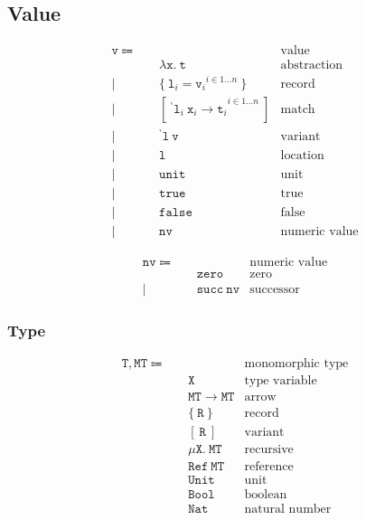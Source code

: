 \documentclass{article}
\newcommand{\code}{\mathtt}
\newcommand{\backtick}{{}^{\backprime}}
\begin{document}
\subsection{Value}

\begin{align*}
\code{v} \Coloneqq \quad & & \text{value} \\
& \code{\lambda x.\ t} & \text{abstraction} \\
| \quad & \{\ {\code{l}_i = \code{v}_i}^{i \in 1\dots n}\ \} & \text{record} \\
| \quad & [ {\code{\ \backtick l}_i\ \code{x}_i \rightarrow \code{t}_i}^{i \in 1\dots n} \ ] & \text{match} \\
| \quad & \code{\backtick l\ v} & \text{variant} \\
| \quad & \code{l} & \text{location} \\
| \quad & \code{unit} & \text{unit} \\
| \quad & \code{true} & \text{true} \\
| \quad & \code{false} & \text{false} \\
| \quad & \code{nv} & \text{numeric value}
\end{align*}

\begin{align*}
\code{nv} \Coloneqq \quad & & \text{numeric value} \\
& \code{zero} & \text{zero} \\
| \quad & \code{succ\ nv} & \text{successor}
\end{align*}

\subsubsection{Type}

\begin{align*}
\code{T, MT} \Coloneqq \quad & & \text{monomorphic type} \\
& \code{X} & \text{type variable} \\
& \code{MT \rightarrow MT} & \text{arrow} \\
& \code{\{\ R\ \}} & \text{record} \\
& \code{[\ R\ ]} & \text{variant} \\
& \code{\mu X.\ MT} & \text{recursive} \\
& \code{Ref\ MT} & \text{reference} \\
& \code{Unit} & \text{unit} \\
& \code{Bool} & \text{boolean} \\
& \code{Nat} & \text{natural number}
\end{align*}
\end{document}
